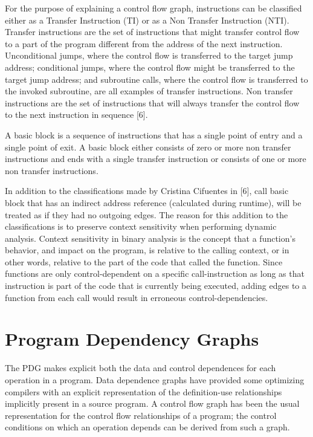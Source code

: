 For the purpose of explaining a control flow graph, instructions can be classified either as a Transfer Instruction (TI) or as a Non Transfer Instruction (NTI). Transfer instructions are the set of instructions that might transfer control flow to a part of the program different from the address of the next instruction. Unconditional jumps, where the control flow is transferred to the
target jump address; conditional jumps, where the control flow might be transferred to the target jump address; and subroutine calls, where the control flow is transferred to the invoked subroutine, are all examples of transfer instructions. Non transfer instructions are the set of instructions that will always transfer the control flow to the next instruction in sequence [6].

A basic block is a sequence of instructions that has a single point of entry and a single point of exit. A basic block either consists of zero or more non transfer instructions and ends with a single transfer instruction or consists of one or more non transfer instructions.

In addition to the classifications made by Cristina Cifuentes in [6], call basic block that has an indirect address reference (calculated during runtime), will be treated as if they had no outgoing edges. The reason for this addition to the classifications is to preserve context sensitivity when performing dynamic analysis. Context sensitivity in binary analysis is the concept that a function’s
behavior, and impact on the program, is relative to the calling context, or in other words, relative to the part of the code that called the function. Since functions are only control-dependent on a specific call-instruction as long as that instruction is part of the code that is currently being executed, adding edges to a function from each call would result in erroneous control-dependencies.

\section{Program Dependency Graphs}

The PDG makes explicit both the data and control dependences for each operation in a program. Data dependence graphs have provided some optimizing compilers with an explicit representation of the definition-use relationships implicitly present in a source program. A control flow graph has been the usual representation for the control flow relationships of a program; the control conditions on which an operation depends can be derived from such a graph.

